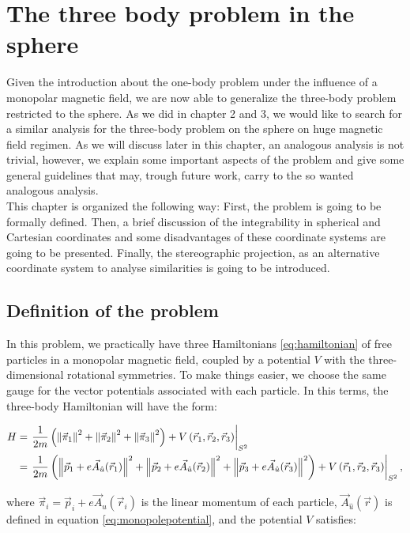 \chapter{The three body problem in the sphere}
Given the introduction about the one-body problem under the influence of a monopolar magnetic field, we are now able to generalize the three-body problem restricted to the sphere. As we did in chapter 2 and 3, we would like to search for a similar analysis for the three-body problem on the sphere on huge magnetic field regimen. As we will discuss later in this chapter, an analogous analysis is not trivial, however, we explain some important aspects of the problem and give some general guidelines that may, trough future work, carry to the so wanted analogous analysis.\\

This chapter is organized the following way: First, the problem is going to be formally defined. Then, a brief discussion of the integrability in spherical and Cartesian coordinates and some disadvantages of these coordinate systems are going to be presented. Finally, the stereographic projection, as an alternative coordinate system to analyse similarities is going to be introduced.\\

\section{Definition of the problem}
In this problem, we practically have three Hamiltonians \eqref{eq:hamiltonian} of free particles in a monopolar magnetic field, coupled by a potential $V$ with the three-dimensional rotational symmetries. To make things easier, we choose the same gauge for the vector potentials associated with each particle. In this terms, the three-body Hamiltonian will have the form:

\begin{align}
H &= \left. \frac{1}{2m}\left( \left\lVert \vec{\pi}_1 \right\rVert^2+\left\lVert \vec{\pi}_2 \right\rVert^2+\left\lVert \vec{\pi}_3 \right\rVert^2 \right) + V\left( \vec{r}_1,\vec{r}_2,\vec{r}_3 \right)    \right|_{S^2} \nonumber \\
&= \left. \frac{1}{2m}\left( \left\lVert \vec{p}_1+e\vec{A}_{\hat{u}}(\vec{r}_1) \right\rVert^2+\left\lVert \vec{p}_2+e\vec{A}_{\hat{u}}(\vec{r}_2) \right\rVert^2+\left\lVert \vec{p}_3+e\vec{A}_{\hat{u}}(\vec{r}_3) \right\rVert^2 \right) + V\left( \vec{r}_1,\vec{r}_2,\vec{r}_3 \right)    \right|_{S^2},
\label{eq:3sphereHam}
\end{align}

where $\vec{\pi}_i = \vec{p}_i+e\vec{A}_{\hat{u}}(\vec{r}_i)$ is the linear momentum of each particle,  $\vec{A}_{\hat{u}}(\vec{r})$ is defined in equation \eqref{eq:monopolepotential}, and the potential $V$ satisfies:

